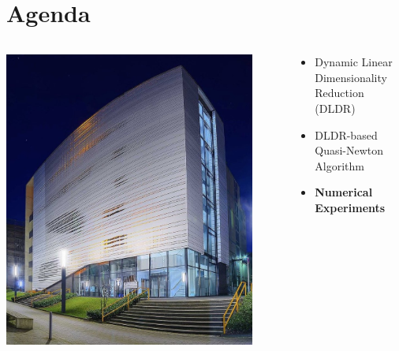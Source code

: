 \documentclass[t]{beamer}
\begin{document}
\section{Agenda}
\begin{frame}
\begin{columns}[c]

\begin{column}{0.5\textwidth}
\begin{center}
\includegraphics[width=0.9\textwidth]{toaster}
\end{center}
\end{column}

\begin{column}{0.5\textwidth}
\begin{itemize}
\item Dynamic Linear Dimensionality Reduction (DLDR) \vspace{1cm}
\item DLDR-based Quasi-Newton Algorithm \vspace{1cm}
\item \textbf{Numerical Experiments} \vspace{1cm} 
\end{itemize}
\end{column}

\end{columns}
\end{frame}
\end{document}
